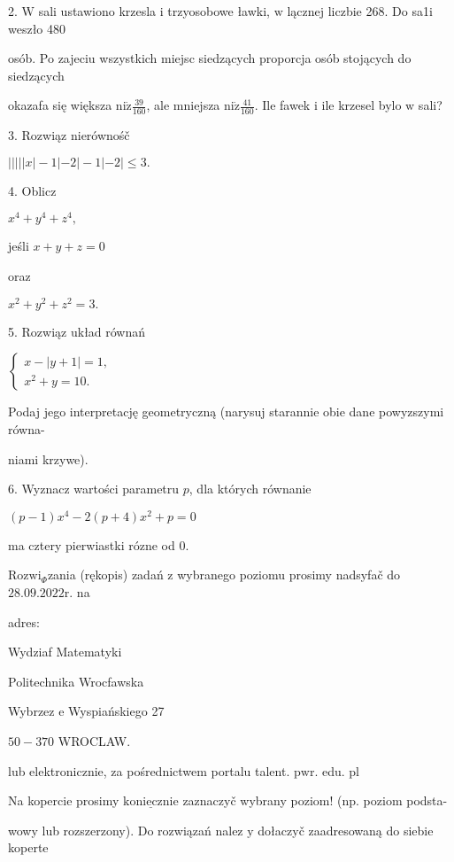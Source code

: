 \documentclass[a4paper,12pt]{article}
\begin{document}
2. $\mathrm{W}$ sali ustawiono krzesla $\mathrm{i}$ trzyosobowe ławki, $\mathrm{w}$ lącznej liczbie 268. Do sa1i weszło 480

osób. Po zajeciu wszystkich miejsc siedzących proporcja osób stojących do siedzących

okazafa się większa $\displaystyle \mathrm{n}\mathrm{i}\dot{\mathrm{z}}\frac{39}{160}$, ale mniejsza $\displaystyle \mathrm{n}\mathrm{i}\dot{\mathrm{z}}\frac{41}{160}$. Ile fawek $\mathrm{i}$ ile krzesel bylo $\mathrm{w}$ sali?

3. Rozwiąz nierównośč

$|||||x|-1|-2|-1|-2|\leq 3.$

4. Oblicz

$x^{4}+y^{4}+z^{4},$

jeśli $x+y+z=0$

oraz

$x^{2}+y^{2}+z^{2}=3.$

5. Rozwiąz układ równań

$\left\{\begin{array}{l}
x-|y+1|=1,\\
x^{2}+y=10.
\end{array}\right.$

Podaj jego interpretację geometryczną (narysuj starannie obie dane powyzszymi równa-

niami krzywe).

6. Wyznacz wartości parametru $p$, dla których równanie

$(p-1)x^{4}-2(p+4)x^{2}+p=0$

ma cztery pierwiastki rózne od 0.

$\mathrm{R}\mathrm{o}\mathrm{z}\mathrm{w}\mathrm{i}_{\Phi}$zania (rękopis) zadań $\mathrm{z}$ wybranego poziomu prosimy nadsyfač do $28.09.2022\mathrm{r}$. na

adres:

Wydziaf Matematyki

Politechnika Wrocfawska

Wybrzez $\mathrm{e}$ Wyspiańskiego 27

$50-370$ WROCLAW.

lub elektronicznie, za pośrednictwem portalu talent. $\mathrm{p}\mathrm{w}\mathrm{r}$. edu. pl

Na kopercie prosimy $\underline{\mathrm{k}\mathrm{o}\mathrm{n}\mathrm{i}\mathrm{e}\mathrm{c}\mathrm{z}\mathrm{n}\mathrm{i}\mathrm{e}}$ zaznaczyč wybrany poziom! (np. poziom podsta-

wowy lub rozszerzony). Do rozwiązań nalez $\mathrm{y}$ dołaczyč zaadresowaną do siebie koperte
\end{document}
